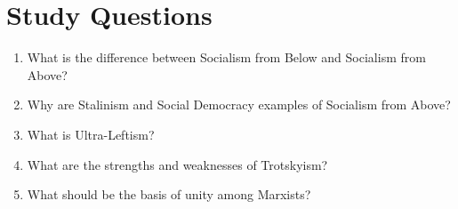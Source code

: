 \documentclass[12pt,a4paper]{report}
\begin{document}
\section{Study Questions}
\begin{enumerate}
	\item What is the difference between Socialism from Below and Socialism from Above?
	\item Why are Stalinism and Social Democracy examples of Socialism from Above?
	\item What is Ultra-Leftism?
	\item What are the strengths and weaknesses of Trotskyism?
	\item What should be the basis of unity among Marxists?
\end{enumerate}
\clearpage
\end{document}
